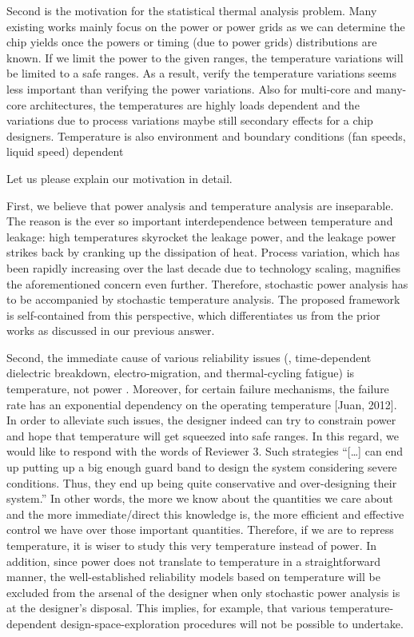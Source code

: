 \begin{reviewer}
Second is the motivation for the statistical thermal analysis problem. Many existing works mainly focus on the power or power grids as we can determine the chip yields once the powers or timing (due to power grids) distributions are known. If we limit the power to the given ranges, the temperature variations will be limited to a safe ranges. As a result, verify the temperature variations seems less important than verifying the power variations. Also for multi-core and many-core architectures, the temperatures are highly loads dependent and the variations due to process variations maybe still secondary effects for a chip designers. Temperature is also environment and boundary conditions (fan speeds, liquid speed) dependent
\end{reviewer}
\begin{authors}
Let us please explain our motivation in detail.

First, we believe that power analysis and temperature analysis are inseparable.
The reason is the ever so important interdependence between temperature and leakage: high temperatures skyrocket the leakage power, and the leakage power strikes back by cranking up the dissipation of heat.
Process variation, which has been rapidly increasing over the last decade due to technology scaling, magnifies the aforementioned concern even further.
Therefore, stochastic power analysis has to be accompanied by stochastic temperature analysis.
The proposed framework is self-contained from this perspective, which differentiates us from the prior works as discussed in our previous answer.

Second, the immediate cause of various reliability issues (\eg, time-dependent dielectric breakdown, electro-migration, and thermal-cycling fatigue) is temperature, not power \perse.
Moreover, for certain failure mechanisms, the failure rate has an exponential dependency on the operating temperature [Juan, 2012].
In order to alleviate such issues, the designer indeed can try to constrain power and hope that temperature will get squeezed into safe ranges.
In this regard, we would like to respond with the words of Reviewer 3.
Such strategies ``[\ldots] can end up putting up a big enough guard band to design the system considering severe conditions.
Thus, they end up being quite conservative and over-designing their system.''
In other words, the more we know about the quantities we care about and the more immediate/direct this knowledge is, the more efficient and effective control we have over those important quantities.
Therefore, if we are to repress temperature, it is wiser to study this very temperature instead of power.
In addition, since power does not translate to temperature in a straightforward manner, the well-established reliability models based on temperature will be excluded from the arsenal of the designer when only stochastic power analysis is at the designer's disposal.
This implies, for example, that various temperature-dependent design-space-exploration procedures will not be possible to undertake.


\end{authors}
